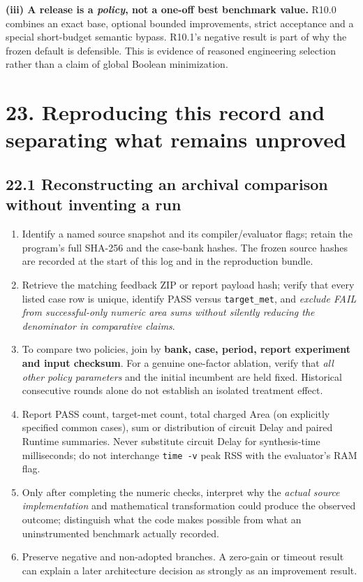 \textbf{(iii) A release is a \emph{policy}, not a one-off best benchmark value.} R10.0 combines an exact base, optional bounded improvements, strict acceptance and a special short-budget semantic bypass. R10.1's negative result is part of why the frozen default is defensible. This is evidence of reasoned engineering selection rather than a claim of global Boolean minimization.

\section{23. Reproducing this record and separating what remains unproved}\label{reproducing-this-record-and-separating-what-remains-unproved}

\subsection{22.1 Reconstructing an archival comparison without inventing a run}\label{reconstructing-an-archival-comparison-without-inventing-a-run}

\begin{enumerate}
\def\labelenumi{\arabic{enumi}.}
\tightlist
\item
  Identify a named source snapshot and its compiler/evaluator flags; retain the program's full SHA-256 and the case-bank hashes. The frozen source hashes are recorded at the start of this log and in the reproduction bundle.
\item
  Retrieve the matching feedback ZIP or report payload hash; verify that every listed case row is unique, identify PASS versus \texttt{target\_met}, and \emph{exclude FAIL from successful-only numeric area sums without silently reducing the denominator in comparative claims}.
\item
  To compare two policies, join by \textbf{bank, case, period, report experiment and input checksum}. For a genuine one-factor ablation, verify that \emph{all other policy parameters} and the initial incumbent are held fixed. Historical consecutive rounds alone do not establish an isolated treatment effect.
\item
  Report PASS count, target-met count, total charged Area (on explicitly specified common cases), sum or distribution of circuit Delay and paired Runtime summaries. Never substitute circuit Delay for synthesis-time milliseconds; do not interchange \texttt{time\ -v} peak RSS with the evaluator's RAM flag.
\item
  Only after completing the numeric checks, interpret why the \emph{actual source implementation} and mathematical transformation could produce the observed outcome; distinguish what the code makes possible from what an uninstrumented benchmark actually recorded.
\item
  Preserve negative and non-adopted branches. A zero-gain or timeout result can explain a later architecture decision as strongly as an improvement result.
\end{enumerate}

